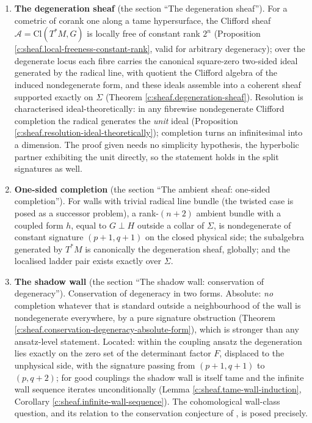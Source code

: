 \documentclass[11pt]{article}
\theoremstyle{definition}
\theoremstyle{plain}
\providecommand{\Cl}{}\renewcommand{\Cl}{\mathrm{Cl}}
\providecommand{\Sig}{}\renewcommand{\Sig}{\Sigma}
\providecommand{\shA}{}\renewcommand{\shA}{\mathcal{A}}
\begin{document}
\begin{enumerate}
\item \textbf{The degeneration sheaf} (the section ``The degeneration sheaf''). For a cometric of corank one along a tame hypersurface, the Clifford sheaf $\shA = \Cl(T^*M, G)$ is locally free of constant rank $2^n$ (Proposition \ref{c:sheaf.local-freeness-constant-rank}, valid for arbitrary degeneracy); over the degenerate locus each fibre carries the canonical square-zero two-sided ideal generated by the radical line, with quotient the Clifford algebra of the induced nondegenerate form, and these ideals assemble into a coherent sheaf supported exactly on $\Sig$ (Theorem \ref{c:sheaf.degeneration-sheaf}). Resolution is characterised ideal-theoretically: in any fibrewise nondegenerate Clifford completion the radical generates the \emph{unit} ideal (Proposition \ref{c:sheaf.resolution-ideal-theoretically}); completion turns an infinitesimal into a dimension. The proof given needs no simplicity hypothesis, the hyperbolic partner exhibiting the unit directly, so the statement holds in the split signatures as well.
\item \textbf{One-sided completion} (the section ``The ambient sheaf: one-sided completion''). For walls with trivial radical line bundle (the twisted case is posed as a successor problem), a rank-$(n{+}2)$ ambient bundle with a coupled form $h$, equal to $G \perp H$ outside a collar of $\Sig$, is nondegenerate of constant signature $(p{+}1,q{+}1)$ on the closed physical side; the subalgebra generated by $T^*M$ is canonically the degeneration sheaf, globally; and the localised ladder pair exists exactly over $\Sig$.
\item \textbf{The shadow wall} (the section ``The shadow wall: conservation of degeneracy''). Conservation of degeneracy in two forms. Absolute: \emph{no} completion whatever that is standard outside a neighbourhood of the wall is nondegenerate everywhere, by a pure signature obstruction (Theorem \ref{c:sheaf.conservation-degeneracy-absolute-form}), which is stronger than any ansatz-level statement. Located: within the coupling ansatz the degeneration lies exactly on the zero set of the determinant factor $F$, displaced to the unphysical side, with the signature passing from $(p{+}1,q{+}1)$ to $(p,q{+}2)$; for good couplings the shadow wall is itself tame and the infinite wall sequence iterates unconditionally (Lemma \ref{c:sheaf.tame-wall-induction}, Corollary \ref{c:sheaf.infinite-wall-sequence}). The cohomological wall-class question, and its relation to the conservation conjecture of \cite[\S7.4]{ButlerT1}, is posed precisely.

\end{enumerate}
\end{document}
